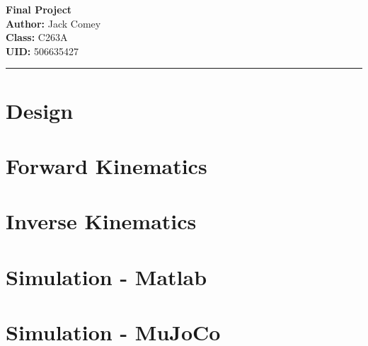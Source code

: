 \documentclass{article}
\begin{document}
\large
\noindent \textbf{Final Project} \\ 
\noindent \textbf{Author:} Jack Comey\\
\noindent \textbf{Class:} C263A\\
\noindent \textbf{UID:} 506635427\\

\noindent \hrule

\normalsize
\tableofcontents

\section{Design}

\section{Forward Kinematics}

\section{Inverse Kinematics}

\section{Simulation - Matlab}

\section{Simulation - MuJoCo}
\end{document}
